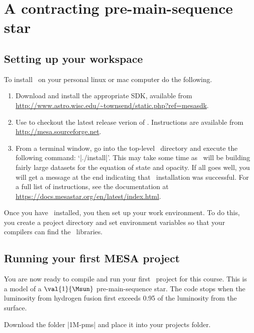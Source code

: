 
\DefineShortVerb{\|}

\section*{ A contracting pre-main-sequence star}\label{s.MESA-contraction}

\subsection{Setting up your workspace}

To install \mesa\ on your personal linux or mac computer do the following.
\begin{enumerate}
	\item Download and install the appropriate SDK, available from \url{http://www.astro.wisc.edu/~townsend/static.php?ref=mesasdk}. 
	\item Use  to checkout the latest release verion of \MESA. Instructions are available from \url{http://mesa.sourceforge.net}.
	\item From a terminal window, go into the top-level \mesa\ directory and execute the following command: `|./install|'.  This may take some time as \mesa\ will be building fairly large datasets for the equation of state and opacity.  If all goes well, you will get a message at the end indicating that \mesa\ installation was successful. For a full list of instructions, see the documentation at \url{https://docs.mesastar.org/en/latest/index.html}.
\end{enumerate}

Once you have \mesa\ installed, you then set up your work environment. To do this, you create a project directory and set environment variables so that your  compilers can find the \mesa\ libraries.

\subsection{Running your first MESA project}

You are now ready to compile and run your first \mesa\ project for this course. This is a model of a $\val{1}{\Msun}$ pre-main-sequence star. The code stops when the luminosity from hydrogen fusion first exceeds 0.95 of the luminosity from the surface. 

Download the folder |1M-pms| and place it into your projects folder.

